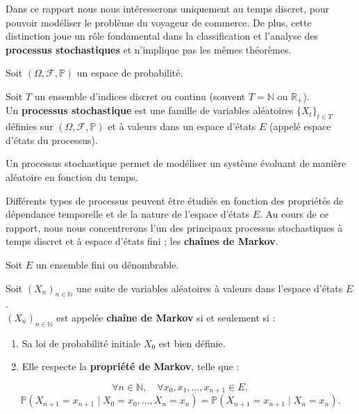 \documentclass{article}
\begin{document}
Dans ce rapport nous nous intéresserons uniquement au temps discret, pour pouvoir modéliser le problème du voyageur de commerce.
De plus, cette distinction joue un rôle fondamental dans la classification et l'analyse des \textbf{processus stochastiques} et n'implique pas les mêmes théorèmes. \\

\begin{tcolorbox}[colback=white,colframe=blue!80!black,title=Processus Stochastique]
Soit $(\Omega, \mathcal{F}, \mathbb{P})$ un espace de probabilité.

Soit $T$ un ensemble d'indices discret ou continu (souvent $T = \mathbb{N}$ ou $\mathbb{R}_+$). \\

Un \textbf{processus stochastique} est une famille de variables aléatoires $\{X_t\}_{t \in T}$ définies sur $(\Omega, \mathcal{F}, \mathbb{P})$ et à valeurs dans un espace d'états $E$ (appelé espace d'états du processus).
\end{tcolorbox}

Un processus stochastique permet de modéliser un système évoluant de manière aléatoire en fonction du temps.

Différents types de processus peuvent être étudiés en fonction des propriétés de dépendance temporelle et de la nature de l'espace d'états $E$.
Au cours de ce rapport, nous nous concentrerons l'un des principaux processus stochastiques à temps discret et à espace d'états fini ; les \textbf{chaînes de Markov}. \\

\begin{tcolorbox}[colback=white,colframe=red!80!black,title=Chaîne de Markov]
Soit $E$ un ensemble fini ou dénombrable.

Soit $(X_n)_{n \in \mathbb{N}}$ une suite de variables aléatoires à valeurs dans l'espace d'états $E$. \\

$(X_n)_{n \in \mathbb{N}}$ est appelée \textbf{chaîne de Markov} si et seulement si :
\begin{enumerate}[leftmargin=5em, label=(\arabic*)]
    \item Sa loi de probabilité initiale $X_0$ est bien définie.
    \item Elle respecte la \textbf{propriété de Markov}, telle que :
\end{enumerate}
\[
\forall n \in \mathbb{N}, \quad \forall x_0, x_1, \dots, x_{n+1} \in E,
\]
\[
\mathbb{P}(X_{n+1} = x_{n+1} \mid X_0 = x_0, \dots, X_n = x_n) = \mathbb{P}(X_{n+1} = x_{n+1} \mid X_n = x_n).
\]
\end{tcolorbox}
\end{document}
